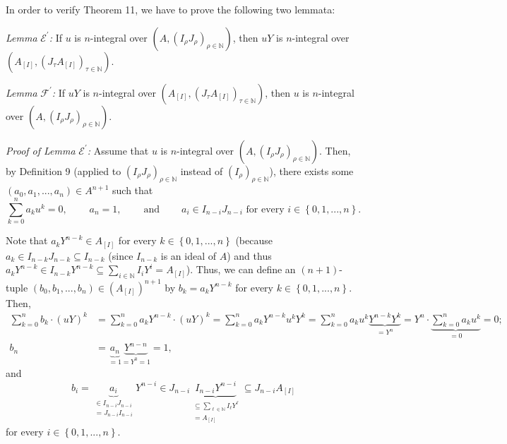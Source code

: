 \documentclass[12pt,final,notitlepage,onecolumn]{article}%
\begin{document}
In order to verify Theorem 11, we have to prove the following two lemmata:

\textit{Lemma }$\mathcal{E}^{\prime}$\textit{:} If $u$ is $n$-integral over
$\left(  A,\left(  I_{\rho}J_{\rho}\right)  _{\rho\in\mathbb{N}}\right)  $,
then $uY$ is $n$-integral over $\left(  A_{\left[  I\right]  },\left(
J_{\tau}A_{\left[  I\right]  }\right)  _{\tau\in\mathbb{N}}\right)  $.

\textit{Lemma} $\mathcal{F}^{\prime}$\textit{:} If $uY$ is $n$-integral over
$\left(  A_{\left[  I\right]  },\left(  J_{\tau}A_{\left[  I\right]  }\right)
_{\tau\in\mathbb{N}}\right)  $, then $u$ is $n$-integral over $\left(
A,\left(  I_{\rho}J_{\rho}\right)  _{\rho\in\mathbb{N}}\right)  $.

\textit{Proof of Lemma }$\mathcal{E}^{\prime}$\textit{:} Assume that $u$ is
$n$-integral over $\left(  A,\left(  I_{\rho}J_{\rho}\right)  _{\rho
\in\mathbb{N}}\right)  $. Then, by Definition 9 (applied to $\left(  I_{\rho
}J_{\rho}\right)  _{\rho\in\mathbb{N}}$ instead of $\left(  I_{\rho}\right)
_{\rho\in\mathbb{N}}$), there exists some $\left(  a_{0},a_{1},...,a_{n}%
\right)  \in A^{n+1}$ such that%
\[
\sum\limits_{k=0}^{n}a_{k}u^{k}=0,\ \ \ \ \ \ \ \ \ \ a_{n}%
=1,\ \ \ \ \ \ \ \ \ \ \text{and}\ \ \ \ \ \ \ \ \ \ a_{i}\in I_{n-i}%
J_{n-i}\text{ for every }i\in\left\{  0,1,...,n\right\}  .
\]


Note that $a_{k}Y^{n-k}\in A_{\left[  I\right]  }$ for every $k\in\left\{
0,1,...,n\right\}  $ (because $a_{k}\in I_{n-k}J_{n-k}\subseteq I_{n-k}$
(since $I_{n-k}$ is an ideal of $A$) and thus $a_{k}Y^{n-k}\in I_{n-k}%
Y^{n-k}\subseteq\sum\limits_{i\in\mathbb{N}}I_{i}Y^{i}=A_{\left[  I\right]  }%
$). Thus, we can define an $\left(  n+1\right)  $-tuple $\left(  b_{0}%
,b_{1},...,b_{n}\right)  \in\left(  A_{\left[  I\right]  }\right)  ^{n+1}$ by
$b_{k}=a_{k}Y^{n-k}$ for every $k\in\left\{  0,1,...,n\right\}  $. Then,%
\begin{align*}
\sum\limits_{k=0}^{n}b_{k}\cdot\left(  uY\right)  ^{k}  &  =\sum
\limits_{k=0}^{n}a_{k}Y^{n-k}\cdot\left(  uY\right)  ^{k}=\sum\limits_{k=0}%
^{n}a_{k}Y^{n-k}u^{k}Y^{k}=\sum\limits_{k=0}^{n}a_{k}u^{k}\underbrace
{Y^{n-k}Y^{k}}_{=Y^{n}}=Y^{n}\cdot\underbrace{\sum\limits_{k=0}^{n}a_{k}u^{k}%
}_{=0}=0;\\
b_{n}  &  =\underbrace{a_{n}}_{=1}\underbrace{Y^{n-n}}_{=Y^{0}=1}=1,
\end{align*}
and%
\[
b_{i}=\underbrace{a_{i}}_{\substack{\in I_{n-i}J_{n-i}\\=J_{n-i}I_{n-i}%
}}Y^{n-i}\in J_{n-i}\underbrace{I_{n-i}Y^{n-i}}_{\substack{\subseteq
\sum\limits_{\ell\in\mathbb{N}}I_{\ell}Y^{\ell}\\=A_{\left[  I\right]  }%
}}\subseteq J_{n-i}A_{\left[  I\right]  }%
\]
for every $i\in\left\{  0,1,...,n\right\}  $.
\end{document}
